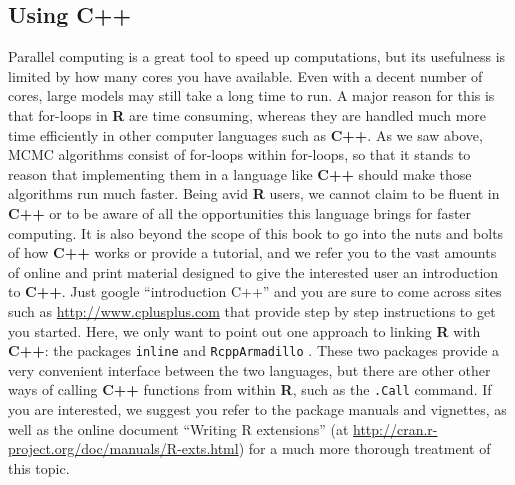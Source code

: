 \subsection{Using {\bf C++}}
Parallel computing is a great tool to speed up computations, but its usefulness is limited by how many cores you have available. Even with a decent number of cores, large models may still take a long time to run. A major reason for this is that for-loops in {\bf R} are time consuming, whereas they are handled much more time efficiently in other computer languages such as {\bf C++}. As we saw above, MCMC algorithms consist of for-loops within for-loops, so that it stands to reason that implementing them in a language like {\bf C++} should make those algorithms run much faster. Being avid {\bf R} users, we cannot claim to be fluent in {\bf C++} or to be aware of all the opportunities this language brings for faster computing. It is also beyond the scope of this book to go into the nuts and bolts of how {\bf C++} works or provide a tutorial, and we refer you to the vast amounts of online and print material designed to give the interested user an introduction to {\bf C++}. Just google ``introduction C++'' and you are sure to come across sites such as \url{http://www.cplusplus.com} that provide step by step instructions to get you started. Here, we only want to point out one  approach to linking {\bf R} with {\bf C++}: the packages {\tt inline} \citep{sklyar_etal:2010} and {\tt RcppArmadillo} \citep{francois_etal:2011}.  These two packages provide a very convenient interface between the two languages, but there are other other ways of calling {\bf C++} functions from within {\bf R}, such as the {\tt .Call} command. If you are interested, we suggest you refer to the package manuals and vignettes, as well as the online document ``Writing R extensions'' (at \url{http://cran.r-project.org/doc/manuals/R-exts.html}) for a much more thorough treatment of this topic.

